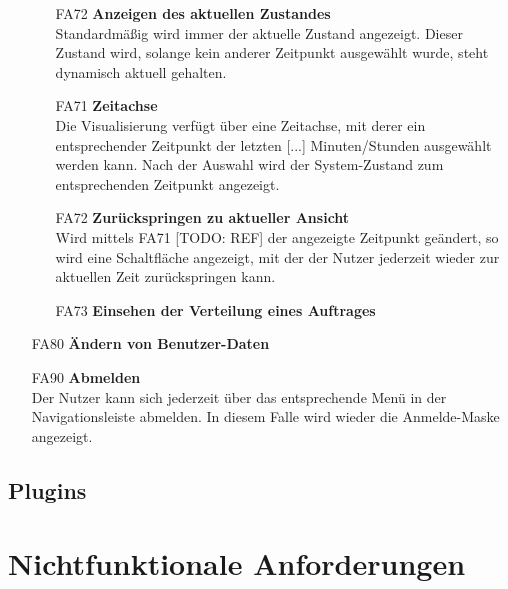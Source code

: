 \begin{itemize}
        \begin{itemize}
            \item[FA72] \textbf{Anzeigen des aktuellen Zustandes} \\
                Standardmäßig wird immer der aktuelle Zustand angezeigt. Dieser Zustand wird, solange kein anderer Zeitpunkt ausgewählt wurde, steht dynamisch aktuell gehalten. 
            \item[FA71] \textbf{Zeitachse} \\
                Die Visualisierung verfügt über eine Zeitachse, mit derer ein entsprechender Zeitpunkt der letzten [...] Minuten/Stunden ausgewählt werden kann. Nach der Auswahl wird der System-Zustand zum entsprechenden Zeitpunkt angezeigt.
            \item[FA72] \textbf{Zurückspringen zu aktueller Ansicht} \\
                Wird mittels FA71 [TODO: REF] der angezeigte Zeitpunkt geändert, so wird eine Schaltfläche angezeigt, mit der der Nutzer jederzeit wieder zur aktuellen Zeit zurückspringen kann.
            \item[FA73] \textbf{Einsehen der Verteilung eines Auftrages} \\
                 
        \end{itemize}
    \item[FA80] \textbf{Ändern von Benutzer-Daten} \\
    
    \item[FA90] \textbf{Abmelden} \\
        Der Nutzer kann sich jederzeit über das entsprechende Menü in der Navigationsleiste abmelden. In diesem Falle wird wieder die Anmelde-Maske angezeigt.
\end{itemize}




\subsection{Plugins}
\section{Nichtfunktionale Anforderungen}